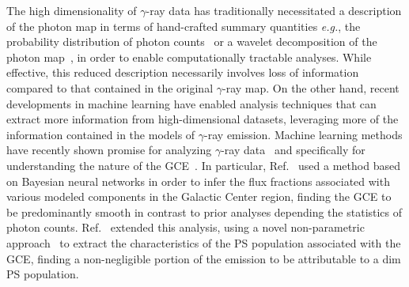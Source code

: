 \documentclass[prd,aps,10pt,nofootinbib,twocolumn,superscriptaddress,preprintnumbers,balancelastpage,longbibliography]{revtex4-1}
\begin{document}
The high dimensionality of $\gamma$-ray data has traditionally necessitated a description of the photon map in terms of hand-crafted summary quantities \emph{e.g.}, the probability distribution of photon counts~\cite{Lee:2014mza,Lee:2015fea} or a wavelet decomposition of the photon map~\cite{Bartels:2015aea,Balaji:2018rwz,McDermott:2015ydv,Zhong:2019ycb}, in order to enable computationally tractable analyses. While effective, this reduced description necessarily involves loss of information compared to that contained in the original $\gamma$-ray map. On the other hand, recent developments in machine learning have enabled analysis techniques that can extract more information from high-dimensional datasets, leveraging more of the information contained in the models of $\gamma$-ray emission. Machine learning methods have recently shown promise for analyzing $\gamma$-ray data~\cite{Caron:2021map} and specifically for understanding the nature of the \Fermi GCE~\cite{List:2020mzd,List:2021aer,Caron:2017udl}. In particular, Ref.~\cite{List:2020mzd} used a method based on Bayesian neural networks in order to infer the flux fractions associated with various modeled components in the Galactic Center region, finding the GCE to be predominantly smooth in contrast to prior analyses depending the statistics of photon counts. Ref.~\cite{List:2021aer} extended this analysis, using a novel non-parametric approach~\cite{list2021earth} to extract the characteristics of the PS population associated with the GCE, finding a non-negligible portion of the emission to be attributable to a dim PS population.
\end{document}
